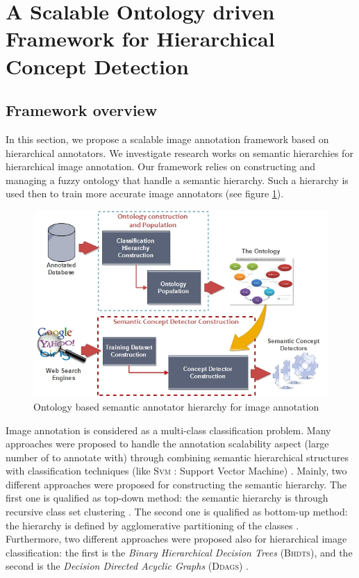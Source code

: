 	\section{A Scalable Ontology driven Framework for Hierarchical Concept Detection}
	\label{c3_2}

	\subsection{Framework overview}

	In this section, we propose a scalable image annotation framework based on hierarchical annotators. 
	We investigate research works on semantic hierarchies for hierarchical image annotation.
	Our framework relies on constructing and managing a fuzzy ontology that handle a semantic 
	hierarchy. Such a hierarchy is used then to train more accurate image annotators (see figure \ref{fig1}).

	\begin{figure}[ht]
		\centering
		\includegraphics[scale=0.7]{graphics/contrib3:figure1}
		\caption{Ontology based semantic annotator hierarchy for image annotation}
		\label{fig1}
	\end{figure}

	Image annotation is considered as a multi-class classification problem. 
	Many approaches were proposed to handle the annotation scalability aspect 
	(large number of  to annotate with) through combining semantic hierarchical
	structures with classification techniques (like \textsc{Svm} : Support Vector Machine)
	\citep{Cevikalp2010,Li2010,Bannour2012,McNamara2015}.
	Mainly, two different approaches were proposed for constructing the semantic hierarchy. 
	The first one is qualified as top-down method: the semantic hierarchy is  through
	recursive class set clustering \citep{Cevikalp2010}. The second one is qualified as
	bottom-up method: the hierarchy is  defined by agglomerative partitioning of the classes
	\citep{Li2010}. Furthermore, two different approaches were proposed also for hierarchical
	image classification: the first is the \textit{Binary Hierarchical Decision Trees} 
	(\textsc{Bhdts})\citep{Cevikalp2010}, and the second is the \textit{Decision Directed 
	Acyclic Graphs} (\textsc{Ddags}) \citep{Gao2011}.

